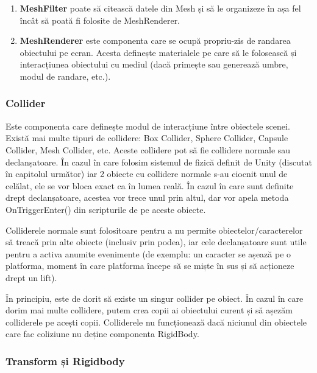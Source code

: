 \documentclass[12pt, a4paper]{article}
\begin{document}
	\begin{enumerate}
		\item \textbf{MeshFilter} poate să citească datele din Mesh și să le organizeze în așa fel încât să poată fi folosite de MeshRenderer.
		\item \textbf{MeshRenderer} este componenta care se ocupă propriu-zis de randarea obiectului pe ecran. Acesta definește materialele pe care să le folosească și interacțiunea obiectului cu mediul (dacă primește sau generează umbre, modul de randare, etc.).
	\end{enumerate}
	
	
	
	
	
	\subsubsection{Collider}
	
	Este componenta care definește modul de interacțiune între obiectele scenei. Există mai multe tipuri de collidere: Box Collider, Sphere Collider, Capsule Collider, Mesh Collider, etc. Aceste collidere pot să fie collidere normale sau declanșatoare. În cazul în care folosim sistemul de fizică definit de Unity (discutat în capitolul următor) iar 2 obiecte cu collidere normale s-au ciocnit unul de celălat, ele se vor bloca exact ca în lumea reală. În cazul în care sunt definite drept declanșatoare, acestea vor trece unul prin altul, dar vor apela metoda OnTriggerEnter() din scripturile de pe aceste obiecte.
	\newline
	
	Colliderele normale sunt folositoare pentru a nu permite obiectelor/caracterelor să treacă prin alte obiecte (inclusiv prin podea), iar cele declanșatoare sunt utile pentru a activa anumite evenimente (de exemplu: un caracter se așează pe o platforma, moment în care platforma începe să se miște în sus și să acționeze drept un lift).
	\newline
	
	În principiu, este de dorit să existe un singur collider pe obiect. În cazul în care dorim mai multe collidere, putem crea copii ai obiectului curent și să așezăm colliderele pe acești copii. Colliderele nu funcționează dacă niciunul din obiectele care fac coliziune nu deține componenta RigidBody.
	
	
	
	
	\subsubsection{Transform și Rigidbody}
	
\end{document}
